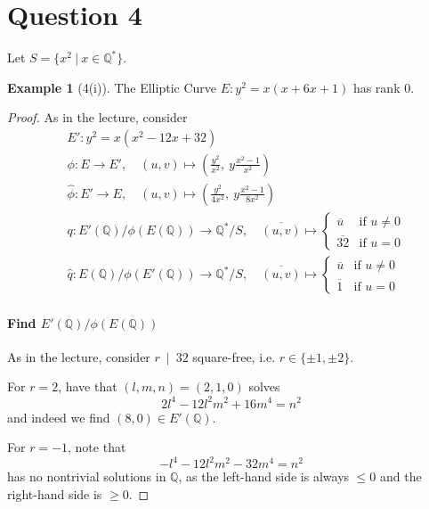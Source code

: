 \documentclass{scrartcl}
\newcommand{\Q}{\mathbb{Q}}
\newcommand{\divides}{\ \mid \ }
\theoremstyle{definition}
\newtheorem{example}[subsection]{Example}
\begin{document}
\section{Question 4}
Let $S = \{ x^2 \ | \ x \in \Q^* \}$.
\begin{example}[4(i)]
    \label{ex:4i}
    The Elliptic Curve $E: y^2 = x(x + 6x + 1)$ has rank $0$.
\end{example}
\begin{proof}
    As in the lecture, consider
    \begin{align*}
        &E': y^2 = x(x^2 - 12x + 32) \\
        &\phi: E \to E', \quad (u, v) \mapsto \left( \frac {y^2} {x^2}, \ y \frac {x^2 - 1} {x^2} \right) \\
        &\hat{\phi}: E' \to E, \quad (u, v) \mapsto \left( \frac {y^2} {4x^2}, \ y \frac {x^2 - 1} {8x^2} \right) \\
        &q: E'(\Q)/\phi(E(\Q)) \to \Q^*/S, \quad \overline{(u, v)} \mapsto \begin{cases}
            \overline{u} & \text{if $u \neq 0$} \\
            \overline{32} & \text{if $u = 0$}
        \end{cases} \\
        &\hat{q}: E(\Q)/\phi(E'(\Q)) \to \Q^*/S, \quad \overline{(u, v)} \mapsto \begin{cases}
            \overline{u} & \text{if $u \neq 0$} \\
            \overline{1} & \text{if $u = 0$}
        \end{cases}
    \end{align*}
    \paragraph{Find $E'(\Q)/\phi(E(\Q))$} As in the lecture, consider $r \divides 32$ square-free, i.e. $r \in \{ \pm 1, \pm 2 \}$.

    For $r = 2$, have that $(l, m, n) = (2, 1, 0)$ solves
    \begin{equation*}
        2l^4 - 12l^2m^2 + 16m^4 = n^2
    \end{equation*}
    and indeed we find $(8, 0) \in E'(\Q)$.

    For $r = -1$, note that
    \begin{equation*}
        -l^4 - 12l^2m^2 - 32m^4 = n^2
    \end{equation*}
    has no nontrivial solutions in $\Q$, as the left-hand side is always $\leq 0$ and the right-hand side is $\geq 0$.


\end{proof}
\end{document}
